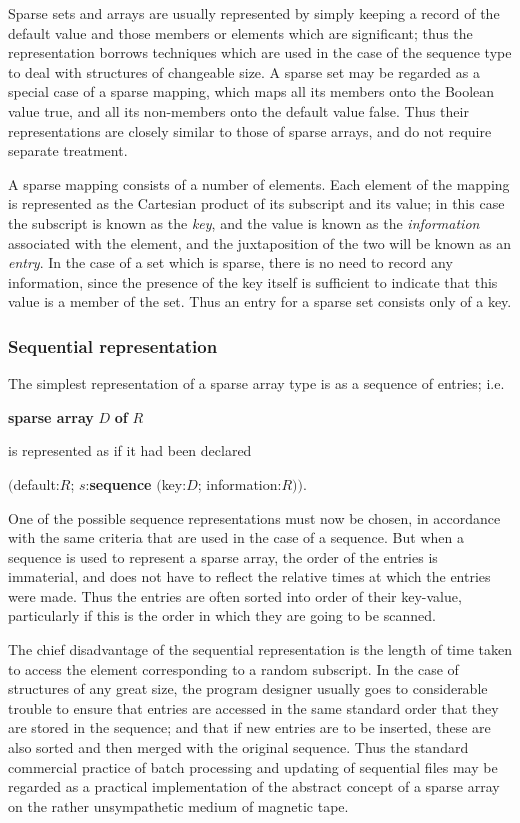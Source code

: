 \noindent
Sparse sets and arrays are usually represented by simply keeping a record of the default value and those members or elements which are significant; thus the representation borrows techniques which are used in the case of the sequence type to deal with structures of changeable size. A sparse set may be regarded as a special case of a sparse mapping, which maps all its members onto the Boolean value true, and all its non-members onto the default value false. Thus their representations are closely similar to those of sparse arrays, and do not require separate treatment.

A sparse mapping consists of a number of elements. Each element of the mapping is represented as the Cartesian product of its subscript and its value; in this case the subscript is known as the \textit{key}, and the value is known as the \textit{information} associated with the element, and the juxtaposition of the two will be known as an \textit{entry}. In the case of a set which is sparse, there is no need to record any information, since the presence of the key itself is sufficient to indicate that this value is a member of the set. Thus an entry for a sparse set consists only of a key.

\subsubsection{Sequential representation}

The simplest representation of a sparse array type is as a sequence of entries;
i.e.

\quad \textbf{sparse array} $D$ \textbf{of} $R$

\noindent
is represented as if it had been declared

\quad $($default:$R$; $s$:\textbf{sequence} $($key:$D$; information:$R))$.

One of the possible sequence representations must now be chosen, in accordance with the same criteria that are used in the case of a sequence. But when a sequence is used to represent a sparse array, the order of the entries is immaterial, and does not have to reflect the relative times at which the entries were made. Thus the entries are often sorted into order of their
key-value, particularly if this is the order in which they are going to be scanned.

The chief disadvantage of the sequential representation is the length of time taken to access the element corresponding to a random subscript. In the case of structures of any great size, the program designer usually goes to considerable trouble to ensure that entries are accessed in the same standard order that they are stored in the sequence; and that if new entries are to be inserted, these are also sorted and then merged with the original sequence. Thus the standard commercial practice of batch processing and updating of sequential files may be regarded as a practical implementation of the abstract concept of a sparse array on the rather unsympathetic medium of magnetic tape.

